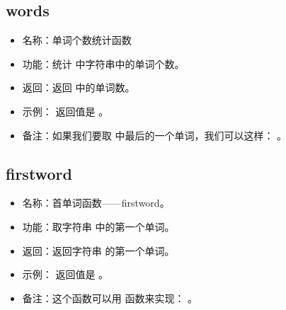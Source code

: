 \documentclass[a4paper,10pt]{sphinxmanual}
\begin{document}
\subsection{words}
\label{\detokenize{functions:words}}
\begin{sphinxVerbatim}[commandchars=\\\{\}]
 \PYGZlt{}\PYGZgt{}
\end{sphinxVerbatim}
\begin{itemize}
\item {} 
名称：单词个数统计函数

\item {} 
功能：统计  中字符串中的单词个数。

\item {} 
返回：返回  中的单词数。

\item {} 
示例：  返回值是  。

\item {} 
备注：如果我们要取  中最后的一个单词，我们可以这样：
 。

\end{itemize}


\subsection{firstword}
\label{\detokenize{functions:firstword}}
\begin{sphinxVerbatim}[commandchars=\\\{\}]
 \PYGZlt{}\PYGZgt{}
\end{sphinxVerbatim}
\begin{itemize}
\item {} 
名称：首单词函数——firstword。

\item {} 
功能：取字符串  中的第一个单词。

\item {} 
返回：返回字符串  的第一个单词。

\item {} 
示例：  返回值是 。

\item {} 
备注：这个函数可以用  函数来实现：  。

\end{itemize}
\end{document}
